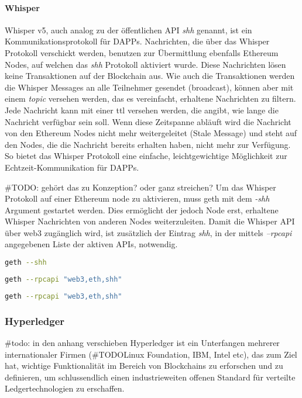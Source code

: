 \paragraph{Whisper}
\label{para:Whisper}
Whisper v5, auch analog zu der öffentlichen API \emph{shh} genannt, ist ein Kommunikationsprotokoll für \acrfull{DAPPs}. Nachrichten, die über das Whisper Protokoll verschickt werden, benutzen zur Übermittlung ebenfalls Ethereum Nodes, auf welchen das \emph{shh} Protokoll aktiviert wurde. Diese Nachrichten lösen keine Transaktionen auf der Blockchain aus. Wie auch die Transaktionen werden die Whisper Messages an alle Teilnehmer gesendet (broadcast), können aber mit einem \emph{topic} versehen werden, das es vereinfacht, erhaltene Nachrichten zu filtern. Jede Nachricht kann mit einer \acrfull{ttl} versehen werden, die angibt, wie lange die Nachricht verfügbar sein soll. Wenn diese Zeitspanne abläuft wird die Nachricht von den Ethereum Nodes nicht mehr weitergeleitet (Stale Message) und steht auf den Nodes, die die Nachricht bereits erhalten haben, nicht mehr zur Verfügung. So bietet das Whisper Protokoll eine einfache, leichtgewichtige Möglichkeit zur Echtzeit-Kommunikation für \acrshort{DAPPs}.

\#TODO: gehört das zu Konzeption? oder ganz streichen? Um das Whisper Protokoll auf einer Ethereum node zu aktivieren, muss geth mit dem \emph{-shh} Argument gestartet werden. Dies ermöglicht der jedoch Node erst, erhaltene Whisper Nachrichten von anderen Nodes weiterzuleiten. Damit die Whisper API über web3 zugänglich wird, ist zusätzlich der Eintrag \emph{shh}, in der mittels \emph{--rpcapi} angegebenen Liste der aktiven APIs, notwendig.
\begin{lstlisting}[language=bash,caption=Beispiel für die Aktivierung des shh Protokolls auf der Ethereum Node]
geth --shh
\end{lstlisting}
\begin{lstlisting}[language=bash,caption={Beispiel für die Aktivierung der web3, eth und shh API}]
geth --rpcapi "web3,eth,shh"
\end{lstlisting}
\begin{lstlisting}[language=bash,caption={Beispiel für die Aktivierung des shh Protokolls und der web3, eth und shh API}]
geth --rpcapi "web3,eth,shh"
\end{lstlisting}

\subsubsection{Hyperledger}
\#todo: in den anhang verschieben
Hyperledger ist ein Unterfangen mehrerer internationaler Firmen (\#TODOLinux Foundation, IBM, Intel etc), das zum Ziel hat, wichtige Funktionalität im Bereich von Blockchains zu erforschen und zu definieren, um schlussendlich einen industrieweiten offenen Standard für verteilte Ledgertechnologien zu erschaffen.\cite{wiki.hyperledger.org/welcome}

